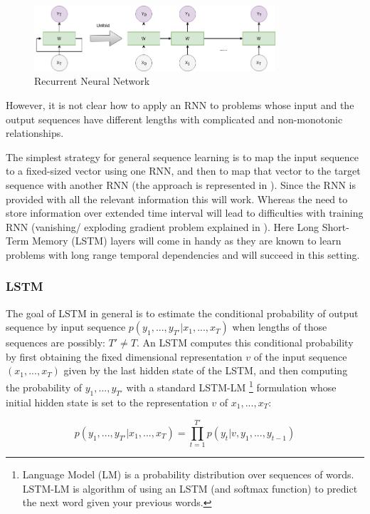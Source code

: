 \begin{figure}[h]
	\centering
	\includegraphics[width=0.8\textwidth]{img/RNN.png}
	\caption{\label{fig:RNN}Recurrent Neural Network}
\end{figure}
 
However, it is not clear how to apply an RNN to problems whose input and the output sequences have different lengths with complicated and non-monotonic relationships.

The simplest strategy for general sequence learning is to map the input sequence to a fixed-sized
vector using one RNN, and then to map that vector to the target sequence with another RNN (the
approach is represented in \cite{baseline_NMT}). Since the RNN is provided with all the relevant information this will work. Whereas the need to store information over extended time interval will lead to difficulties with training RNN (vanishing/ exploding gradient problem explained in \cite{LSTM_baseline}).
Here Long Short-Term Memory (LSTM) layers will come in handy as they are known to learn problems with long range temporal dependencies and will succeed in this setting.

\subsubsection{LSTM}

The goal of LSTM in general is to estimate the conditional probability of output sequence by input sequence $p(y_1, ..., y_{T′}|x_1, ..., x_T )$ when lengths of those sequences are possibly: $T' \neq T$. 
An LSTM computes this conditional probability by first obtaining the fixed dimensional
representation $v$ of the input sequence $(x_1, ..., x_T)$ given by the last hidden state of the LSTM, and then computing the probability of $y_1, ..., y_{T′}$ with a standard LSTM-LM
\footnote{Language Model (LM) is a probability distribution over sequences of words. LSTM-LM is algorithm of using an LSTM (and softmax function) to predict the next word given your previous words.} 
formulation whose initial hidden state is set to the representation $v$ of  $x_1, ..., x_T$:

$$p(y_1, ..., y_{T′}|x_1, ..., x_T ) = \prod_{t=1}^{T'} p(y_t|v, y_1, ..., y_{t-1}) $$


